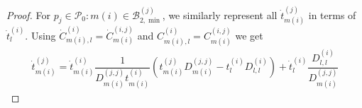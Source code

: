 \documentclass{article}
\begin{document}
\begin{proof}
 For $p_j\in\mathcal{P}_{0}:m(i)\in\mathcal{B}_{2,\min}^{(j)}$, we similarly represent all $\dot{t}^{(j)}_{m(i)}$ in terms of $\dot{t}^{(i)}_l$. Using $\dot{C}^{(i)}_{m(i),l}=\dot{C}^{(i,j)}_{m(i)}$ and ${C}^{(i)}_{m(i),l}=C^{(i,j)}_{m(i)}$ we get
    \begin{align*}
        \dot{t}^{(j)}_{m(i)} =  \dot{t}^{(i)}_{m(i)}\dfrac{1}{D^{(j,j)}_{m(i)}t^{(i)}_{m(i)}}(t^{(j)}_{m(i)}D^{(j,j)}_{m(i)}-t^{(i)}_lD^{(i)}_{l,l})+ \dot{t}^{(i)}_l\dfrac{D^{(i)}_{l,l}}{D^{(j,j)}_{m(i)}}
    \end{align*}

\end{proof}
\end{document}
